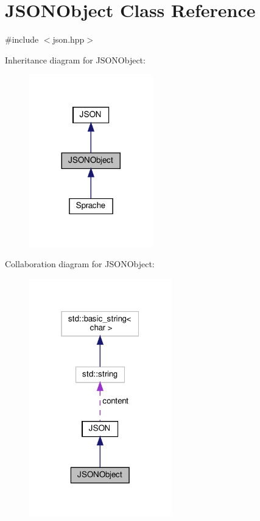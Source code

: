 \hypertarget{class_j_s_o_n_object}{}\section{J\+S\+O\+N\+Object Class Reference}
\label{class_j_s_o_n_object}


{\ttfamily \#include $<$json.\+hpp$>$}



Inheritance diagram for J\+S\+O\+N\+Object\+:
\nopagebreak
\begin{figure}[H]
\begin{center}
\leavevmode
\includegraphics[width=152pt]{class_j_s_o_n_object__inherit__graph}
\end{center}
\end{figure}


Collaboration diagram for J\+S\+O\+N\+Object\+:
\nopagebreak
\begin{figure}[H]
\begin{center}
\leavevmode
\includegraphics[width=175pt]{class_j_s_o_n_object__coll__graph}
\end{center}
\end{figure}
